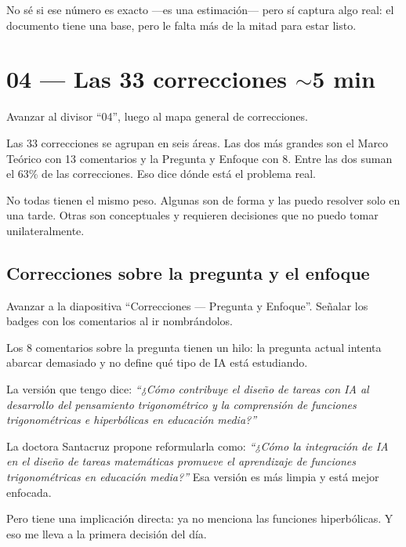 \documentclass[11pt, letterpaper]{article}
\newenvironment{accion}{%
  \par\smallskip
  \color{GrisAnotacion}\small\itshape\faHandPointRight\enspace
}{%
  \par\smallskip\normalcolor\normalsize\normalfont
}
\begin{document}
No sé si ese número es exacto —es una estimación— pero sí captura algo real: el documento tiene una base, pero le falta más de la mitad para estar listo.

\section{04 — Las 33 correcciones \hfill {\normalfont\small\color{GrisAnotacion}$\sim$5 min}}

\begin{accion}
  Avanzar al divisor ``04'', luego al mapa general de correcciones.
\end{accion}

Las 33 correcciones se agrupan en seis áreas. Las dos más grandes son el Marco Teórico con 13 comentarios y la Pregunta y Enfoque con 8. Entre las dos suman el 63\% de las correcciones. Eso dice dónde está el problema real.

No todas tienen el mismo peso. Algunas son de forma y las puedo resolver solo en una tarde. Otras son conceptuales y requieren decisiones que no puedo tomar unilateralmente.

\subsection{Correcciones sobre la pregunta y el enfoque}

\begin{accion}
  Avanzar a la diapositiva ``Correcciones — Pregunta y Enfoque''.
  Señalar los badges con los comentarios al ir nombrándolos.
\end{accion}

Los 8 comentarios sobre la pregunta tienen un hilo: la pregunta actual intenta abarcar demasiado y no define qué tipo de IA está estudiando.

La versión que tengo dice: \textit{``¿Cómo contribuye el diseño de tareas con IA al desarrollo del pensamiento trigonométrico y la comprensión de funciones trigonométricas e hiperbólicas en educación media?''}

La doctora Santacruz propone reformularla como: \textit{``¿Cómo la integración de IA en el diseño de tareas matemáticas promueve el aprendizaje de funciones trigonométricas en educación media?''} Esa versión es más limpia y está mejor enfocada.

Pero tiene una implicación directa: ya no menciona las funciones hiperbólicas. Y eso me lleva a la primera decisión del día.
\end{document}
